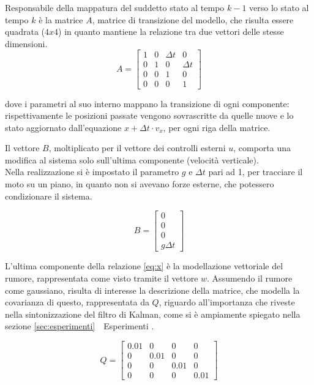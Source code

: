 Responsabile della mappatura del suddetto stato al tempo $k-1$ verso lo stato al tempo $k$ è la matrice $A$, matrice di transizione del modello, che risulta essere quadrata ($4 x 4$) in quanto mantiene la relazione tra due vettori delle stesse dimensioni.
\begin{equation}\label{eq:matriceA}
 A = 
\begin{bmatrix}
 1 & 0 & \Delta t & 0 \\
 0 & 1 & 0 & \Delta t \\
 0 & 0 & 1 & 0 \\
 0 & 0 & 0 & 1
\end{bmatrix}
\end{equation} 

dove i parametri al suo interno mappano la transizione di ogni componente: rispettivamente le posizioni passate vengono sovrascritte da quelle nuove e lo stato aggiornato dall'equazione $x + \Delta t \cdot v_x$, per ogni riga della matrice.

Il vettore $B$, moltiplicato per il vettore dei controlli esterni $u$, comporta una modifica al sistema solo sull'ultima componente (velocità verticale).\\%
Nella realizzazione si è impostato il parametro $g$  e $ \Delta t$ pari ad 1, per tracciare il moto su un piano, in quanto non si avevano forze esterne, che potessero condizionare il sistema. 

\begin{equation}
 B =\begin{bmatrix} 0 \\ 0 \\ 0 \\ g \Delta t \end{bmatrix}\end{equation} 

L'ultima componente della relazione \ref{eq:x} è la modellazione vettoriale del rumore, rappresentata come visto tramite il vettore $w$. Assumendo il rumore come gaussiano, risulta di interesse la descrizione della matrice, che modella la covarianza di questo, rappresentata da $Q$, riguardo all'importanza che riveste nella sintonizzazione del filtro di Kalman, come si è ampiamente spiegato nella sezione \ref{sec:esperimenti}~~Esperimenti .

 
\begin{equation}
Q = \begin{bmatrix} 
0.01 & 0 & 0 & 0\\
0 & 0.01 & 0 & 0\\
0 & 0 & 0.01 & 0\\
0 & 0 & 0 & 0.01
\end{bmatrix}\end{equation} 


